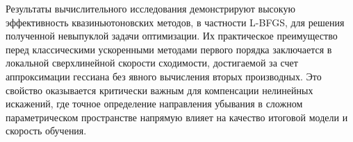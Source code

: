 Результаты вычислительного исследования демонстрируют высокую эффективность квазиньютоновских методов, в частности L-BFGS, для решения полученной невыпуклой задачи оптимизации. Их практическое преимущество перед классическими ускоренными методами первого порядка заключается в локальной сверхлинейной скорости сходимости, достигаемой за счет аппроксимации гессиана без явного вычисления вторых производных. Это свойство оказывается критически важным для компенсации нелинейных искажений, где точное определение направления убывания в сложном параметрическом пространстве напрямую влияет на качество итоговой модели и скорость обучения.